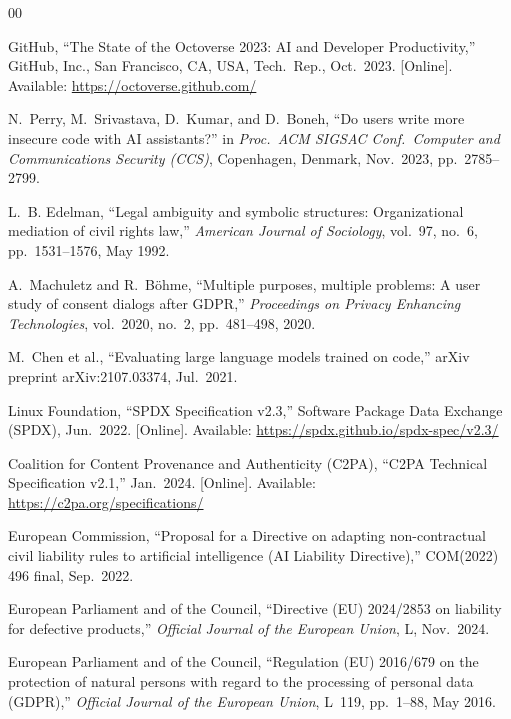 \documentclass[conference]{IEEEtran}
\begin{document}
\begin{thebibliography}{00}

GitHub, ``The State of the Octoverse 2023: AI and Developer
Productivity,'' GitHub, Inc., San Francisco, CA, USA, Tech.\ Rep.,
Oct.\ 2023. [Online]. Available: \url{https://octoverse.github.com/}

N.~Perry, M.~Srivastava, D.~Kumar, and D.~Boneh, ``Do users write more
insecure code with AI assistants?'' in \emph{Proc.\ ACM SIGSAC Conf.\
Computer and Communications Security (CCS)}, Copenhagen, Denmark,
Nov.\ 2023, pp.\ 2785--2799.

L.~B. Edelman, ``Legal ambiguity and symbolic structures: Organizational
mediation of civil rights law,'' \emph{American Journal of Sociology},
vol.\ 97, no.\ 6, pp.\ 1531--1576, May 1992.

A.~Machuletz and R.~B\"{o}hme, ``Multiple purposes, multiple problems:
A user study of consent dialogs after GDPR,'' \emph{Proceedings on
Privacy Enhancing Technologies}, vol.\ 2020, no.\ 2,
pp.\ 481--498, 2020.

M.~Chen et al., ``Evaluating large language models trained on code,''
arXiv preprint arXiv:2107.03374, Jul.\ 2021.

Linux Foundation, ``SPDX Specification v2.3,'' Software Package Data
Exchange (SPDX), Jun.\ 2022. [Online]. Available:
\url{https://spdx.github.io/spdx-spec/v2.3/}

Coalition for Content Provenance and Authenticity (C2PA), ``C2PA
Technical Specification v2.1,'' Jan.\ 2024. [Online]. Available:
\url{https://c2pa.org/specifications/}

European Commission, ``Proposal for a Directive on adapting
non-contractual civil liability rules to artificial intelligence (AI
Liability Directive),'' COM(2022) 496 final, Sep.\ 2022.

European Parliament and of the Council, ``Directive (EU) 2024/2853 on
liability for defective products,'' \emph{Official Journal of the
European Union}, L, Nov.\ 2024.

European Parliament and of the Council, ``Regulation (EU) 2016/679 on
the protection of natural persons with regard to the processing of
personal data (GDPR),'' \emph{Official Journal of the European Union},
L~119, pp.\ 1--88, May 2016.


\end{thebibliography}
\end{document}
